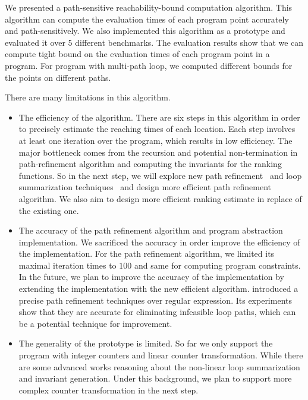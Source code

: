 We presented a path-sensitive reachability-bound computation algorithm.
This algorithm can compute the evaluation times of each program point accurately and path-sensitively.
We also implemented this algorithm as a prototype and evaluated it over 5 different benchmarks.
The evaluation results show that we can compute tight bound on the evaluation times of each program point in a program. For program with multi-path loop, we computed different bounds for the points on different paths.

There are many limitations in this algorithm.
\begin{itemize}
    \item The efficiency of the algorithm.
    There are six steps in this algorithm in order to precisely estimate the reaching times of each location. Each step involves at least one iteration over the program, which results in low efficiency.
    The major bottleneck comes from the recursion and potential non-termination in path-refinement algorithm and computing the invariants for the ranking functions. So in the next step, we will explore new path refinement~\cite{CyphertBKR19} and loop summarization techniques~\cite{BreckCKR20,KincaidBCR19,KincaidCBR18} and design more efficient path refinement algorithm. We also aim to design more efficient ranking estimate in replace of the existing one.
    \item The accuracy of the path refinement algorithm and program abstraction implementation.
    We sacrificed the accuracy in order improve the efficiency of the implementation. For the path refinement algorithm,
    we limited its maximal iteration times to $100$ and same for computing program constraints. 
    In the future, we plan to improve the accuracy of the implementation by extending the implementation with the new efficient algorithm.
    \cite{CyphertBKR19} introduced a precise path refinement techniques over regular expression. Its experiments show that they are accurate for eliminating infeasible loop paths, which can be a potential technique for improvement.
    \item The generality of the prototype is limited. So far we only support the program with integer counters and linear counter transformation. While there are some advanced works reasoning about the non-linear loop summarization and invariant generation. Under this background, we plan to support more complex counter transformation in the next step.
\end{itemize}